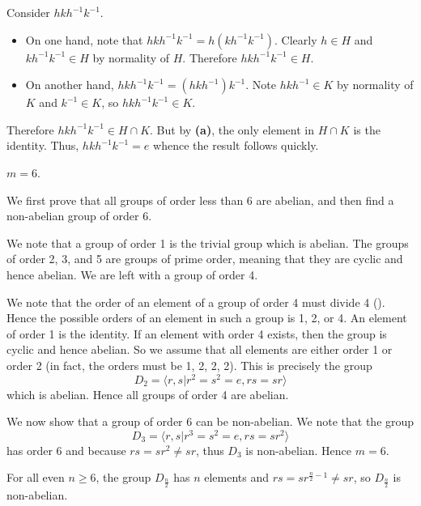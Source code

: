 \begin{questions}
\begin{partquestions}{\alph*}
        \item Consider $hkh^{-1}k^{-1}$.
        \begin{itemize}
            \item On one hand, note that $hkh^{-1}k^{-1} = h(kh^{-1}k^{-1})$. Clearly $h \in H$ and $kh^{-1}k^{-1} \in H$ by normality of $H$. Therefore $hkh^{-1}k^{-1} \in H$.
            \item On another hand, $hkh^{-1}k^{-1} = (hkh^{-1})k^{-1}$. Note $hkh^{-1} \in K$ by normality of $K$ and $k^{-1} \in K$, so $hkh^{-1}k^{-1} \in K$.
        \end{itemize}
        Therefore $hkh^{-1}k^{-1} \in H \cap K$. But by \textbf{(a)}, the only element in $H \cap K$ is the identity. Thus, $hkh^{-1}k^{-1} = e$ whence the result follows quickly.
    \end{partquestions}

    \item \begin{partquestions}{\alph*}
        \item $m = 6$.
        \item We first prove that all groups of order less than 6 are abelian, and then find a non-abelian group of order 6.

        We note that a group of order 1 is the trivial group which is abelian. The groups of order 2, 3, and 5 are groups of prime order, meaning that they are cyclic and hence abelian. We are left with a group of order 4.

        We note that the order of an element of a group of order 4 must divide 4 (). Hence the possible orders of an element in such a group is 1, 2, or 4. An element of order 1 is the identity. If an element with order 4 exists, then the group is cyclic and hence abelian. So we assume that all elements are either order 1 or order 2 (in fact, the orders must be 1, 2, 2, 2). This is precisely the group
        \[
            D_2 = \langle r, s \vert r^2 = s^2 = e, rs = sr\rangle
        \]
        which is abelian. Hence all groups of order 4 are abelian.

        We now show that a group of order 6 can be non-abelian. We note that the group
        \[
            D_3 =  \langle r, s \vert r^3 = s^2 = e, rs = sr^2\rangle
        \]
        has order 6 and because $rs = sr^2 \neq sr$, thus $D_3$ is non-abelian. Hence $m = 6$.

        \item For all even $n \geq 6$, the group $D_{\frac n2}$ has $n$ elements and $rs = sr^{\frac n2 - 1} \neq sr$, so $D_{\frac n2}$ is non-abelian.
    \end{partquestions}


\end{questions}
